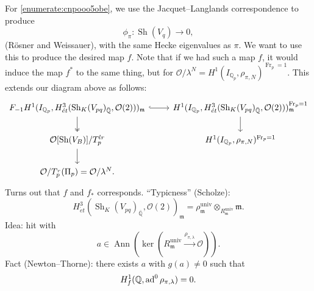 \documentclass[reqno]{amsart} 
\begin{document}
For \eqref{enumerate:cnpooo5obe}, we use the Jacquet--Langlands correspondence to produce
\begin{equation*}
  \phi_\pi : \operatorname{Sh}(V_q) \rightarrow 0,
\end{equation*}
(R{\"o}sner and Weissauer), with the same Hecke eigenvalues as $\pi$.  We want to use this to produce the desired map $f$.  Note that if we had such a map $f$, it would induce the map $f^\ast$ to the same thing, but for $\mathcal{O} / \lambda^N = H^1(I_{\mathbb{Q}_p}, \rho_{\pi, N})^{\operatorname{Fr}_p = 1}$.  This extends our diagram above as follows:
\begin{equation}\label{eq:cnpoop7atc}
  \begin{tikzcd}
    F_{- 1} H^1(I_{\mathbb{Q}_p}, H_{\acute{e}t}^3(\operatorname{Sh}_K(V_{p q})_{\bar{\mathbb{Q}}}, \mathcal{O}(2)))_{\mathfrak{m}}
    \arrow[r, hookrightarrow] & H^1(I_{\mathbb{Q}_p}, H^3_{\acute{e}t}
    (\operatorname{Sh}_K(V_{p q})_{\bar{\mathbb{Q}}}, \mathcal{O}(2)))^{\operatorname{Fr}_p = 1}_{\mathfrak{m}} \\
    \mathcal{O}[\operatorname{Sh}(V_B)] / T_p^{l r} \arrow[u, twoheadleftarrow] &
    H^1(I_{\mathbb{Q}_p}, \rho_{\pi, N})^{\operatorname{Fr}_p = 1} \arrow[u, leftarrow] \\
    \mathcal{O} / T_p^{_r}(\Pi_p) = \mathcal{O} / \lambda^N \arrow[u, leftarrow].
  \end{tikzcd}
\end{equation}
Turns out that $f$ and $f_\ast$ corresponds.  ``Typicness'' (Scholze):
\begin{equation*}
  H_{\acute{e} t}^3(\operatorname{Sh}_K(V_{p q})_{\bar{\mathbb{Q}}}, \mathcal{O}(2))_{\mathfrak{m}}
  = \rho_{\mathfrak{m}}^{\mathrm{univ}} \otimes_{R_{\mathfrak{m}}^{\mathrm{univ}}} \mathfrak{m}.
\end{equation*}
Idea: hit with
\begin{equation*}
  a \in \operatorname{Ann}(\ker(R_{\mathfrak{m}}^{\mathrm{univ}} \xrightarrow{\rho_{\pi, \lambda }} \mathcal{O})).
\end{equation*}
Fact (Newton--Thorne): there exists $a$ with $g(a) \neq 0$ such that
\begin{equation*}
  H_f^1(\mathbb{Q}, \operatorname{ad}^0 \rho_{\pi, \lambda }) = 0.
\end{equation*}
\end{document}
